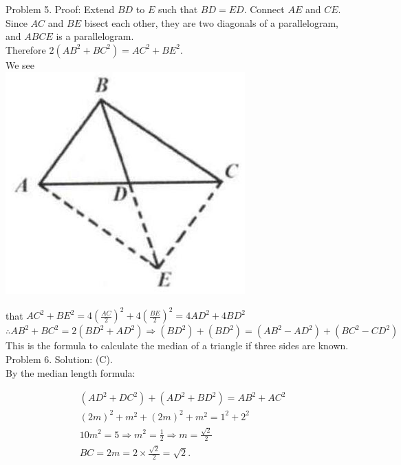 \documentclass[10pt]{article}
\begin{document}
Problem 5. Proof:
Extend \(B D\) to \(E\) such that \(B D=E D\). Connect \(A E\) and \(C E\). Since \(A C\) and \(B E\) bisect each other, they are two diagonals of a parallelogram, and \(A B C E\) is a parallelogram.\\
Therefore \(2\left(A B^{2}+B C^{2}\right)=A C^{2}+B E^{2}\).\\
We see\\
\includegraphics[max width=\textwidth, center]{2025_04_17_97bc1f7e44d93c271a88g-030(1)}


that \(A C^{2}+B E^{2}=4\left(\frac{A C}{2}\right)^{2}+4\left(\frac{B E}{2}\right)^{2}=4 A D^{2}+4 B D^{2}\)\\
\(\therefore A B^{2}+B C^{2}=2\left(B D^{2}+A D^{2}\right) \Rightarrow\left(B D^{2}\right)+\left(B D^{2}\right)=\left(A B^{2}-A D^{2}\right)+\left(B C^{2}-C D^{2}\right)\)\\
This is the formula to calculate the median of a triangle if three sides are known.\\
Problem 6. Solution: (C).\\
By the median length formula:

\[
\begin{aligned}
& \left(A D^{2}+D C^{2}\right)+\left(A D^{2}+B D^{2}\right)=A B^{2}+A C^{2} \\
& (2 m)^{2}+m^{2}+(2 m)^{2}+m^{2}=1^{2}+2^{2} \\
& 10 m^{2}=5 \Rightarrow m^{2}=\frac{1}{2} \Rightarrow m=\frac{\sqrt{2}}{2} \\
& B C=2 m=2 \times \frac{\sqrt{2}}{2}=\sqrt{2} .
\end{aligned}
\]
\end{document}
